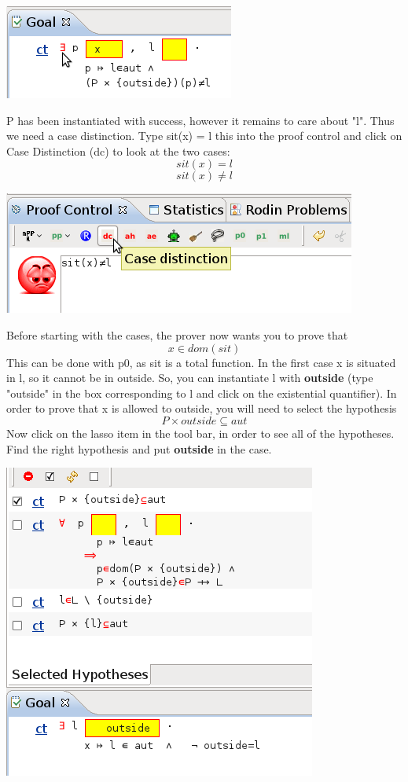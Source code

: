 \begin{center}
	\includegraphics[]{img/tutorial/tut_10_instantiate_p.png}
\end{center}

P has been instantiated with success, however it remains to care about "l". Thus we need a case distinction.
Type sit(x) = l this into the proof control and click on Case Distinction (dc) to look at the two cases:
\[
sit(x)=l 
\]
\[
sit(x) \neq l
\]
\begin{center}
	\includegraphics[]{img/tutorial/tut_10_case_distinction.png}
\end{center}

Before starting with the cases, the prover now wants you to prove that 
\[
 x \in dom(sit)
\]
This can be done with p0, as sit is a total function. In the first case x is situated in l, so it cannot be in outside. So, you can instantiate l with \textbf{outside} (type "outside" in the box corresponding to l and click on the existential quantifier). In order to prove that x is allowed to outside, you will need to select the hypothesis
\[
P \times outside \subseteq aut
\]
Now click on the lasso item in the tool bar, in order to see all of the hypotheses. Find the right hypothesis and put \textbf{outside} in the case.
\begin{center}
	\includegraphics[]{img/tutorial/tut_10_outside.png}
\end{center}

